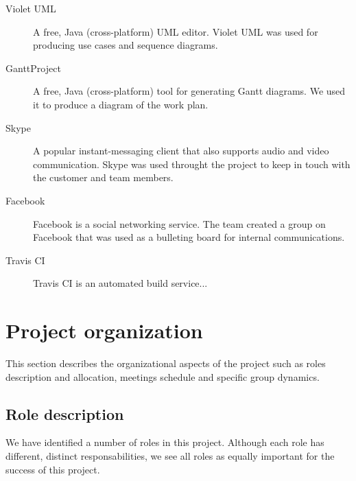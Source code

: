 \begin{description}
\item[Violet UML]
A free, Java (cross-platform) UML editor. Violet UML was used for producing use cases and sequence diagrams.

\item[GanttProject]
A free, Java (cross-platform) tool for generating Gantt diagrams. We used it to produce a diagram of the work plan.

\item[Skype]
A popular instant-messaging client that also supports audio and video communication.
Skype was used throught the project to keep in touch with the customer and team members.

\item[Facebook]
Facebook is a social networking service. The team created a group on Facebook that was used as a bulleting board for internal communications.

\item[Travis CI]
Travis CI is an automated build service...


\end{description}





\section{Project organization}
\label{section:organization}

This section describes the organizational aspects of the project such as roles description and allocation, meetings schedule and
specific group dynamics.

\subsection{Role description}
We have identified a number of roles in this project. Although each role has different, distinct responsabilities, we see all roles as equally important for the success of this project.

